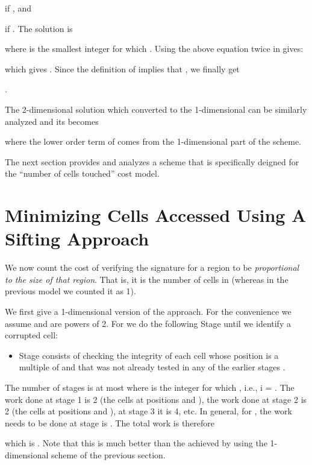 \documentclass{llncs}
\begin{document}
\noindent if , and



\noindent if .  The solution is



\noindent

where  is the smallest integer for which
.  Using
the above equation twice in  gives:



\noindent which gives .
Since the definition of  implies that 
, we finally get

.

The 2-dimensional solution which converted to the 1-dimensional
can be similarly analyzed and its  becomes



\noindent where the lower order term of  comes
from the 1-dimensional part of the scheme.

The next section provides and analyzes a scheme that is 
specifically deigned for the ``number of cells touched''
cost model.

\section{Minimizing Cells Accessed Using A Sifting Approach}
\label{SiftingApproach}
We now count the cost of verifying the signature for a region  
to be {\em proportional to the size of that region}. 
That is, it is the number of cells in  (whereas in the previous model we counted it as 1).


We first give a 1-dimensional version of the approach.
For the convenience we assume  and  are powers of 2.
For  we do the following 
Stage  until we identify a corrupted cell:

\begin{itemize}
\item
Stage  consists of checking the integrity of 
each cell whose position is a multiple of 
and that was not already tested in any of
the earlier stages .
\end{itemize}

The number of stages is at most  where
 is the integer for which 
, i.e., i = .
The work done at stage 1 is 2 (the cells at 
positions  and ), the work done at stage 2 is 2
(the cells at positions  and ), at stage 3
it is 4, etc.  In general,
for , the work needs to be done at stage  is .
The total work is therefore



\noindent which is .  Note that this
is much better than the  achieved by using
the 1-dimensional scheme of the previous section.
\end{document}
